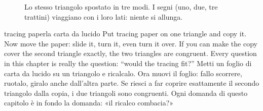 \begin{figure}[htbp]
\centering
%
      {Lo stesso triangolo spostato in tre modi. I segni (uno, due, tre trattini) viaggiano con i loro lati: niente si allunga.}
\label{fig:moves}
\end{figure}

\begin{anchor}{tracing paper}{la carta da lucido}
Put tracing paper on one triangle and copy it. Now move the paper: slide it, turn it, even turn it over. If you can make the copy cover the second triangle exactly, the two triangles are congruent. Every question in this chapter is really the question: ``would the tracing fit?''
\tcblower
Metti un foglio di carta da lucido su un triangolo e ricalcalo. Ora muovi il foglio: fallo scorrere, ruotalo, giralo anche dall'altra parte. Se riesci a far coprire esattamente il secondo triangolo dalla copia, i due triangoli sono congruenti. Ogni domanda di questo capitolo è in fondo la domanda: «il ricalco combacia?»
\end{anchor}

